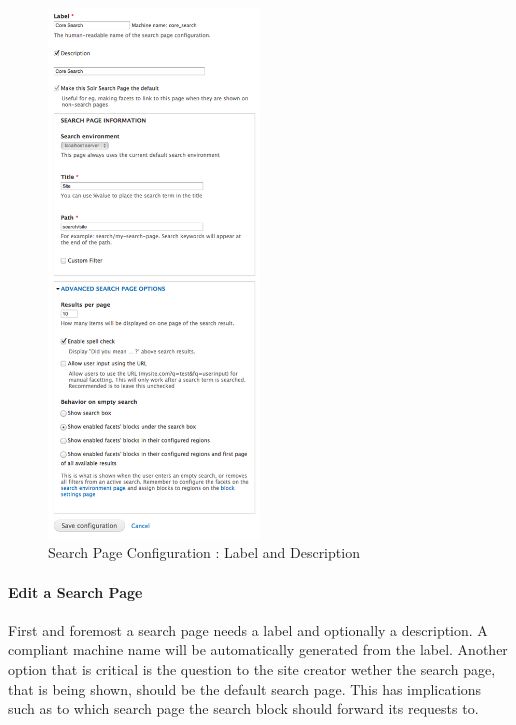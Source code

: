 \begin{figure}
\begin{center}
     \includegraphics[width=0.5\textwidth]{images/implementation/search_page_detail.png}
     \caption{Search Page Configuration : Label and Description}
\end{center}
\end{figure}
\paragraph{Edit a Search Page} First and foremost a search page needs a label and optionally a description. A compliant machine name will be automatically generated from the label. Another option that is critical is the question to the site creator wether the search page, that is being shown, should be the default search page. This has implications such as to which search page the search block should forward its requests to. 


